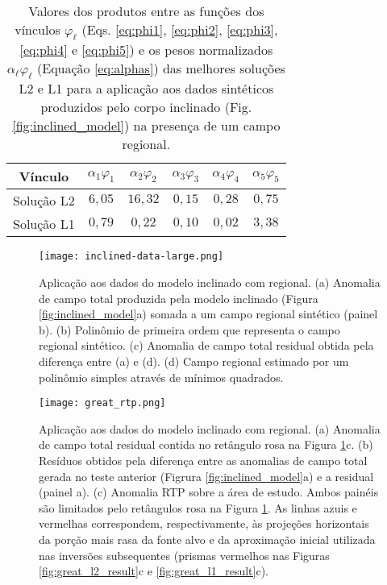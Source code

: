 \begin{table}[h]\label{tab:inc-reg}
	\caption{Valores dos produtos entre as funções dos vínculos $ \varphi_{\ell} $ (Eqs. \ref{eq:phi1}, \ref{eq:phi2}, \ref{eq:phi3}, \ref{eq:phi4} e \ref{eq:phi5}) e os pesos normalizados $ \alpha_\ell \varphi_\ell  $ (Equação \ref{eq:alphas}) das melhores soluções L2 e L1 para a aplicação aos dados sintéticos produzidos pelo corpo inclinado (Fig. \ref{fig:inclined_model}) na presença de um campo regional.}
	\centering
	\vspace{0.5cm}
	\begin{tabular}{c|ccccc}
		Vínculo & $ \alpha_{1}\varphi _1 $ & $ \alpha_{2}\varphi _2 $ &  $ \alpha_{3}\varphi _3 $ &  $ \alpha_{4}\varphi _4 $ &  $ \alpha_{5}\varphi _5 $ \\
		\hline
		Solução L2 & $ 6,05 $ & $ 16,32 $ & $ 0,15 $ & $0,28 $ & $ 0,75 $ \\ 
		Solução L1 & $ 0,79 $ & $ 0,22 $ & $ 0,10 $ & $0,02$ & $ 3,38$
	\end{tabular}
\end{table}

\begin{figure}[!htb]
	\texttt{[image: inclined-data-large.png]}
	\caption{Aplicação aos dados do modelo inclinado com regional. 
		(a) Anomalia de campo total produzida pela modelo inclinado (Figura \ref{fig:inclined_model}a) somada a um campo regional sintético (painel b).
		(b) Polinômio de primeira ordem que representa o campo regional sintético.
		(c) Anomalia de campo total residual obtida pela diferença entre (a) e (d). (d) Campo regional estimado por um polinômio simples através de mínimos quadrados.
	}
	\label{fig:great_data}
\end{figure}
\pagebreak

\pagebreak

\begin{figure}[!htb]
	\centering
	\texttt{[image: great\_rtp.png]}
	\caption{Aplicação aos dados do modelo inclinado com regional. 
		(a) Anomalia de campo total residual contida no retângulo rosa na Figura \ref{fig:great_data}c. (b) Resíduos obtidos pela diferença entre as anomalias de campo total gerada no teste anterior (Figrura \ref{fig:inclined_model}a) e a residual (painel a). (c) Anomalia RTP sobre a área de estudo. Ambos painéis são limitados pelo retângulos rosa na Figura \ref{fig:great_data}. As linhas azuis e vermelhas correspondem, respectivamente, às projeções horizontais da porção mais rasa da fonte alvo e da aproximação inicial utilizada nas inversões subsequentes (prismas vermelhos nas Figuras \ref{fig:great_l2_result}c e 
		\ref{fig:great_l1_result}c).
	}
	\label{fig:great_model_rtp}
\end{figure}

